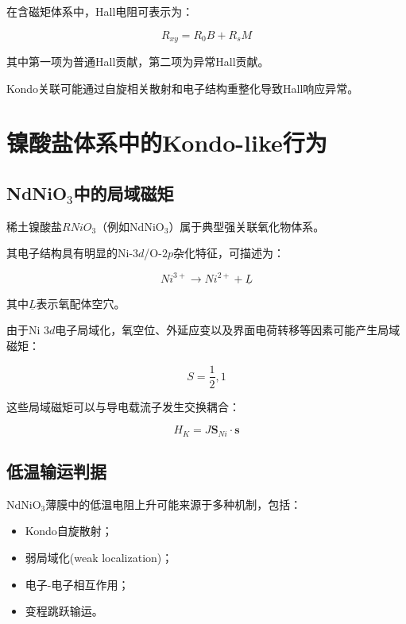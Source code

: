 \documentclass[10.5pt]{article}
\begin{document}
在含磁矩体系中，Hall电阻可表示为：

\begin{equation}
R_{xy}=R_0B+R_sM
\end{equation}

其中第一项为普通Hall贡献，第二项为异常Hall贡献。

Kondo关联可能通过自旋相关散射和电子结构重整化导致Hall响应异常。


\section{镍酸盐体系中的Kondo-like行为}

\subsection{NdNiO$_3$中的局域磁矩}

稀土镍酸盐$RNiO_3$（例如NdNiO$_3$）属于典型强关联氧化物体系。

其电子结构具有明显的Ni-$3d$/O-$2p$杂化特征，可描述为：

\begin{equation}
Ni^{3+}\rightarrow Ni^{2+}+\underline{L}
\end{equation}

其中$\underline{L}$表示氧配体空穴。

由于Ni $3d$电子局域化，氧空位、外延应变以及界面电荷转移等因素可能产生局域磁矩：

\begin{equation}
S=\frac{1}{2},1
\end{equation}

这些局域磁矩可以与导电载流子发生交换耦合：

\begin{equation}
H_K=J\bm{S}_{Ni}\cdot\bm{s}
\end{equation}


\subsection{低温输运判据}

NdNiO$_3$薄膜中的低温电阻上升可能来源于多种机制，包括：

\begin{itemize}
\item Kondo自旋散射；
\item 弱局域化(weak localization)；
\item 电子-电子相互作用；
\item 变程跳跃输运。
\end{itemize}
\end{document}
